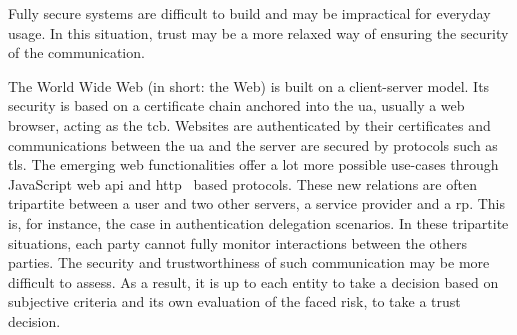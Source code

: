 Fully secure systems are difficult to build and may be impractical for everyday usage. 
In this situation, trust may be a more relaxed way of ensuring the security of the communication.

The World Wide Web (in short: the Web) is built on a client-server model.
Its security is based on a certificate chain anchored into the \gls{ua}, usually a web browser, acting as the \gls{tcb}.
Websites are authenticated by their certificates and communications between the \gls{ua} and the server are secured by protocols such as \gls{tls}. 
The emerging web functionalities offer a lot more possible use-cases through JavaScript web \gls{api} and \gls{http}~\cite{RFC2616} based protocols.
These new relations are often tripartite between a user and two other servers, a service provider and a \gls{rp}.
This is, for instance, the case in authentication delegation scenarios.
In these tripartite situations, each party cannot fully monitor interactions between the others parties.
The security and trustworthiness of such communication may be more difficult to assess.
As a result, it is up to each entity to take a decision based on subjective criteria and its own evaluation of the faced risk, \ie to take a trust decision.

